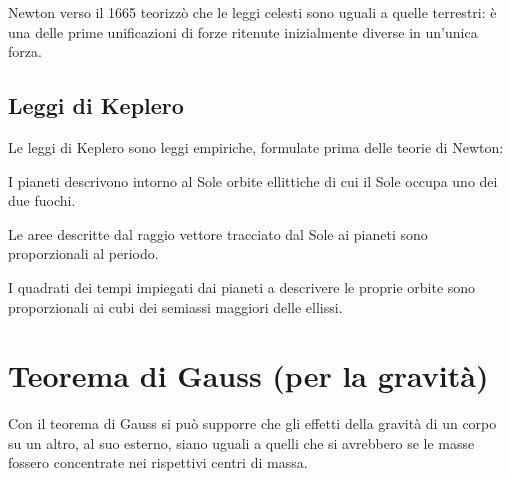 Newton verso il 1665 teorizzò che le leggi celesti sono uguali a quelle terrestri: è una delle prime unificazioni di forze ritenute inizialmente diverse in un'unica forza.

\subsection{Leggi di Keplero}
Le leggi di Keplero sono leggi empiriche, formulate prima delle
teorie di Newton:
\begin{legge}
  I pianeti descrivono intorno al Sole orbite ellittiche di cui il Sole occupa uno dei due fuochi. \end{legge}
\begin{legge}
  Le aree descritte dal raggio vettore tracciato dal Sole ai pianeti sono proporzionali al periodo.
\end{legge}
\begin{legge}
  I quadrati dei tempi impiegati dai pianeti a descrivere le proprie orbite sono proporzionali ai cubi dei semiassi maggiori delle ellissi.
\end{legge}


\section{Teorema di Gauss (per la gravità)}
Con il teorema di Gauss si può supporre che gli effetti della
gravità di un corpo su un altro, al suo esterno, siano uguali a
quelli che si avrebbero se le masse fossero concentrate nei rispettivi centri di massa.



